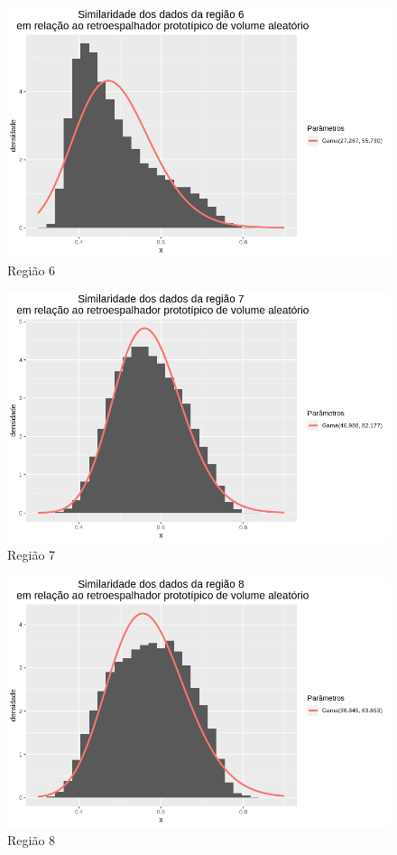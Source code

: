 \documentclass[12pt]{article}
\begin{document}
\begin{figure}[!h]
    \centering
    \vspace{0.1\linewidth}
    \includegraphics[width = 0.95\linewidth]{../../Images/Report_18_12_17/rv_region6.png}
    \caption{Região 6}
    \label{fig:rv_r6}
\end{figure}

\begin{figure}[!h]
    \centering
    \vspace{0.05\linewidth}
    \includegraphics[width = 0.95\linewidth]{../../Images/Report_18_12_17/rv_region7.png}
    \caption{Região 7}
    \label{fig:rv_r7}
\end{figure}

\begin{figure}[!h]
    \centering    
    \vspace{0.1\linewidth}
    \includegraphics[width = 0.95\linewidth]{../../Images/Report_18_12_17/rv_region8.png}
    \caption{Região 8}
    \label{fig:rv_r8}
\end{figure}



\end{document}

